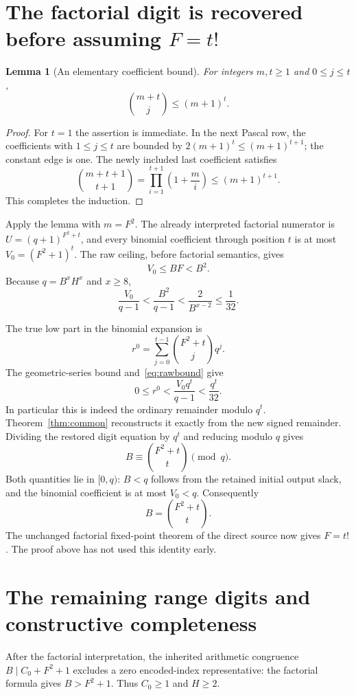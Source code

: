 \documentclass[11pt,letterpaper]{article}
\newtheorem{lemma}[theorem]{Lemma}
\theoremstyle{remark}\newtheorem{remark}[theorem]{Remark}
\begin{document}
\section{The factorial digit is recovered before assuming $F=t!$}

\begin{lemma}[An elementary coefficient bound]\label{lem:binom}
For integers $m,t\ge1$ and $0\le j\le t$,
\[
 \binom{m+t}{j}\le(m+1)^t.
\]
\end{lemma}
\begin{proof}
For $t=1$ the assertion is immediate. In the next Pascal row, the
coefficients with $1\le j\le t$ are bounded by
$2(m+1)^t\le(m+1)^{t+1}$; the constant edge is one. The newly included
last coefficient satisfies
\[
 \binom{m+t+1}{t+1}
 =\prod_{i=1}^{t+1}\left(1+\frac mi\right)
 \le(m+1)^{t+1}.
\]
This completes the induction.
\end{proof}

Apply the lemma with $m=F^2$. The already interpreted factorial numerator
is $U=(q+1)^{F^2+t}$, and every binomial coefficient through position $t$
is at most $V_0=(F^2+1)^t$. The raw ceiling, before factorial semantics,
gives
\[
 V_0\le BF<B^2.
\]
Because $q=B^xH^x$ and $x\ge8$,
\begin{equation}\label{eq:rawbound}
 \frac{V_0}{q-1}
 <\frac{B^2}{q-1}
 <\frac{2}{B^{x-2}}\le\frac1{32}.
\end{equation}

The true low part in the binomial expansion is
\[
 r^0=\sum_{j=0}^{t-1}\binom{F^2+t}{j}q^j.
\]
The geometric-series bound and~\eqref{eq:rawbound} give
\[
 0\le r^0<\frac{V_0q^t}{q-1}<\frac{q^t}{32}.
\]
In particular this is indeed the ordinary remainder modulo $q^t$.
Theorem~\ref{thm:common} reconstructs it exactly from the new signed
remainder. Dividing the restored digit equation by $q^t$ and reducing
modulo $q$ gives
\[
 B\equiv\binom{F^2+t}{t}\pmod q.
\]
Both quantities lie in $[0,q)$: $B<q$ follows from the retained initial
output slack, and the binomial coefficient is at most $V_0<q$.
Consequently
\[
 B=\binom{F^2+t}{t}.
\]
The unchanged factorial fixed-point theorem of the direct source now
gives $F=t!$. The proof above has not used this identity early.

\section{The remaining range digits and constructive completeness}

After the factorial interpretation, the inherited arithmetic congruence
$B\mid C_0+F^2+1$ excludes a zero encoded-index representative: the
factorial formula gives $B>F^2+1$. Thus $C_0\ge1$ and $H\ge2$.
\end{document}
